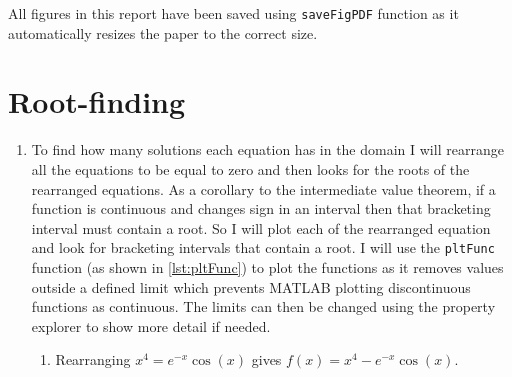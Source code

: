 \documentclass[a4paper,11pt]{article}
\begin{document}

\tableofcontents

\hfill \break

All figures in this report have been saved using \verb*|saveFigPDF| function 
as it automatically resizes the paper to the correct size.


\section{Root-finding}
\begin{enumerate}
	\item To find how many solutions each equation has in the domain  I 
	will rearrange all the equations to be equal to zero and then looks for 
	the roots of the rearranged equations. As a corollary to the intermediate 
	value theorem, if a function is continuous and changes sign in an 
	interval 
	then that bracketing interval must contain a root. So I will plot each of 
	the 
	rearranged equation and look for bracketing intervals that contain a 
	root. I will use the 
	\verb*|pltFunc| function (as shown in \autoref{lst:pltFunc}) to plot the 
	functions as it removes values 
	outside a defined limit which prevents MATLAB plotting discontinuous 
	functions as continuous. The limits can then be changed using the 
	property explorer to show more detail if needed.
	\begin{enumerate}
		\item Rearranging $x^{4} = e^{-x} \cos(x)$ gives $f(x) = x^{4} - 
		e^{-x} \cos(x)$.
		
\end{enumerate}
\end{enumerate}
\end{document}
